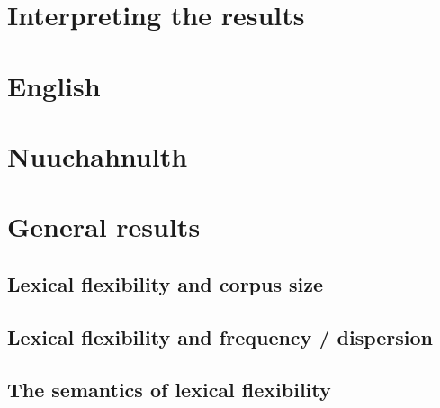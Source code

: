 \section{Interpreting the results}
\label{sec:4.2}

\section{English}
\label{sec:4.3}

\section{Nuuchahnulth}
\label{sec:4.4}

\section{General results}
\label{sec:4.5}

\subsection{Lexical flexibility and corpus size}
\label{sec:4.5.1}

\subsection{Lexical flexibility and frequency / dispersion}
\label{sec:4.5.2}

\subsection{The semantics of lexical flexibility}
\label{sec:4.5.3}
